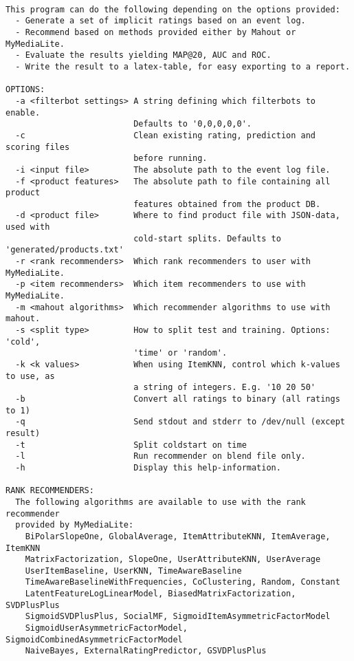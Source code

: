 \begin{lstlisting}

This program can do the following depending on the options provided:
  - Generate a set of implicit ratings based on an event log.
  - Recommend based on methods provided either by Mahout or MyMediaLite.
  - Evaluate the results yielding MAP@20, AUC and ROC.
  - Write the result to a latex-table, for easy exporting to a report.

OPTIONS:
  -a <filterbot settings> A string defining which filterbots to enable.
                          Defaults to '0,0,0,0,0'.
  -c                      Clean existing rating, prediction and scoring files
                          before running.
  -i <input file>         The absolute path to the event log file.
  -f <product features>   The absolute path to file containing all product
                          features obtained from the product DB.
  -d <product file>       Where to find product file with JSON-data, used with
                          cold-start splits. Defaults to 'generated/products.txt'
  -r <rank recommenders>  Which rank recommenders to user with MyMediaLite.
  -p <item recommenders>  Which item recommenders to use with MyMediaLite.
  -m <mahout algorithms>  Which recommender algorithms to use with mahout.
  -s <split type>         How to split test and training. Options: 'cold',
                          'time' or 'random'.
  -k <k values>           When using ItemKNN, control which k-values to use, as
                          a string of integers. E.g. '10 20 50'
  -b                      Convert all ratings to binary (all ratings to 1)
  -q                      Send stdout and stderr to /dev/null (except result)
  -t                      Split coldstart on time
  -l                      Run recommender on blend file only.
  -h                      Display this help-information.

RANK RECOMMENDERS:
  The following algorithms are available to use with the rank recommender
  provided by MyMediaLite:
    BiPolarSlopeOne, GlobalAverage, ItemAttributeKNN, ItemAverage, ItemKNN
    MatrixFactorization, SlopeOne, UserAttributeKNN, UserAverage
    UserItemBaseline, UserKNN, TimeAwareBaseline
    TimeAwareBaselineWithFrequencies, CoClustering, Random, Constant
    LatentFeatureLogLinearModel, BiasedMatrixFactorization, SVDPlusPlus
    SigmoidSVDPlusPlus, SocialMF, SigmoidItemAsymmetricFactorModel
    SigmoidUserAsymmetricFactorModel, SigmoidCombinedAsymmetricFactorModel
    NaiveBayes, ExternalRatingPredictor, GSVDPlusPlus


\end{lstlisting}

